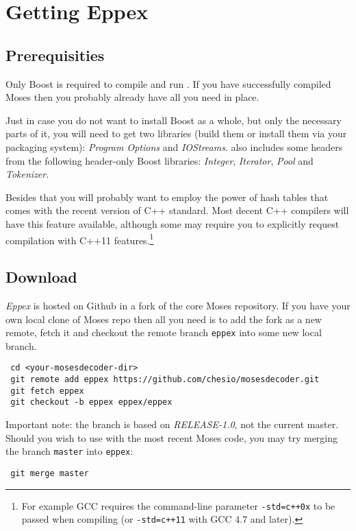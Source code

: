 \chapter{Getting Eppex}
\label{chap:getting-eppex}

\section{Prerequisities}

Only Boost is required to compile and run \eppex{}.
If you have successfully compiled Moses then you probably already have all you need in place.

Just in case you do not want to install Boost as a whole, but only the necessary
parts of it, you will need to get two libraries (build them or install
them via your packaging system): \emph{Program Options} and \emph{IOStreams}.
\Eppex{} also includes some headers from the following header-only Boost libraries:
\emph{Integer}, \emph{Iterator}, \emph{Pool} and \emph{Tokenizer}.

Besides that you will probably want to employ the power of hash tables
that comes with the recent version of C++ standard.
Most decent C++ compilers will have this feature available,
although some may require you to explicitly request compilation with C++11
features.\footnote{For example GCC requires the command-line parameter
\texttt{-std=c++0x} to be passed when compiling (or \texttt{-std=c++11}
with GCC 4.7 and later).}

\section{Download}

\emph{Eppex} is hosted on Github in
a fork
of the core Moses repository.
If you have your own local clone of Moses repo then all you need is to add
the fork as a new remote, fetch it and checkout the remote branch
\texttt{eppex} into some new local branch.
\begin{verbatim}
 cd <your-mosesdecoder-dir>
 git remote add eppex https://github.com/chesio/mosesdecoder.git
 git fetch eppex
 git checkout -b eppex eppex/eppex
\end{verbatim}

Important note: the \eppex{} branch is based on \emph{RELEASE-1.0},
not the current master. Should you wish to use \eppex{} with the most
recent Moses code, you may try merging the branch \texttt{master} into \texttt{eppex}:
\begin{verbatim}
 git merge master
\end{verbatim}

